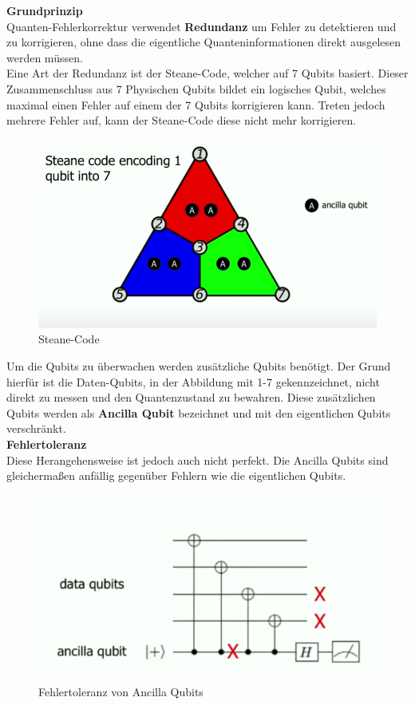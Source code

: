 \textbf{Grundprinzip}\\
Quanten-Fehlerkorrektur verwendet \textbf{Redundanz} um Fehler zu detektieren und zu korrigieren, ohne dass die eigentliche Quanteninformationen direkt ausgelesen werden müssen.\\

Eine Art der Redundanz ist der Steane-Code, welcher auf 7 Qubits basiert. Dieser Zusammenschluss aus 7 Physischen Qubits bildet ein logisches Qubit,
welches maximal einen Fehler auf einem der 7 Qubits korrigieren kann. Treten jedoch mehrere Fehler auf, kann der Steane-Code diese nicht mehr korrigieren.\\

\begin{figure}[H]
    \centering
    \includegraphics[width=0.75\linewidth]{img/Steane.png}
    \caption{Steane-Code \cite[2m30s]{qutech_academy_quantum_2018}}
    \label{fig:Steane}
\end{figure}

Um die Qubits zu überwachen werden zusätzliche Qubits benötigt. Der Grund hierfür ist die Daten-Qubits, in der Abbildung mit 1-7 gekennzeichnet, nicht direkt zu messen und den Quantenzustand zu bewahren.
Diese zusätzlichen Qubits werden als \textbf{Ancilla Qubit} bezeichnet und mit den eigentlichen Qubits verschränkt.\\

\textbf{Fehlertoleranz}\\
Diese Herangehensweise ist jedoch auch nicht perfekt. Die Ancilla Qubits sind gleichermaßen anfällig gegenüber Fehlern wie die eigentlichen Qubits.\\

\begin{figure}[H]
    \centering
    \includegraphics[width=0.75\linewidth]{img/Fehlertoleranz.png}
    \caption{Fehlertoleranz von Ancilla Qubits \cite[50s]{qutech_academy_quantum_2018}}
    \label{fig:Fehlertoleranz}
\end{figure}

